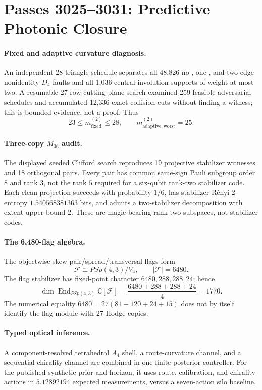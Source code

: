 \section*{Passes 3025--3031: Predictive Photonic Closure}

\paragraph{Fixed and adaptive curvature diagnosis.}
An independent 28-triangle schedule separates all 48,826 no-, one-, and two-edge
nonidentity \(D_4\) faults and all 1,036 central-involution supports of weight at most
two.  A resumable 27-row cutting-plane search examined 259 feasible adversarial
schedules and accumulated 12,336 exact collision cuts without finding a witness;
this is bounded evidence, not a proof.  Thus
\[
  23\le m_{\mathrm{fixed}}^{(2)}\le 28,
  \qquad
  m_{\mathrm{adaptive,worst}}^{(2)}=25.
\]

\paragraph{Three-copy \(M_{36}\) audit.}
The displayed seeded Clifford search reproduces 19 projective stabilizer witnesses and
18 orthogonal pairs.  Every pair has common same-sign Pauli subgroup order \(8\) and
rank \(3\), not the rank \(5\) required for a six-qubit rank-two stabilizer code.
Each clean projection succeeds with probability \(1/6\), has stabilizer
R\'enyi-2 entropy \(1.540568381363\) bits, and admits a two-stabilizer decomposition
with extent upper bound \(2\).  These are magic-bearing rank-two subspaces, not
stabilizer codes.

\paragraph{The 6,480-flag algebra.}
The objectwise skew-pair/spread/transversal flags form
\[
  \mathcal F\cong PSp(4,3)/V_4,\qquad |\mathcal F|=6480.
\]
The flag stabilizer has fixed-point character \(6480,288,288,24\); hence
\[
  \dim\operatorname{End}_{PSp(4,3)}\mathbb C[\mathcal F]
  =\frac{6480+288+288+24}{4}=1770.
\]
The numerical equality \(6480=27(81+120+24+15)\) does not by itself identify the
flag module with 27 Hodge copies.

\paragraph{Typed optical inference.}
A component-resolved tetrahedral \(A_4\) shell, a route-curvature channel, and a
sequential chirality channel are combined in one finite posterior controller.  For the
published synthetic prior and horizon, it uses route, calibration, and chirality actions
in \(5.12892194\) expected measurements, versus a seven-action silo baseline.

